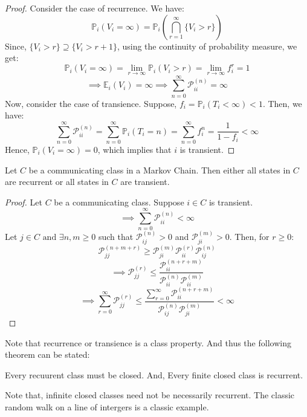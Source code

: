 \begin{proof}
    Consider the case of recurrence. We have:
    \[
        \mathbb{P} _i (V_i = \infty ) = \mathbb{P} _i \left( 
            \bigcap_{r=1}^{\infty} \{V_i > r\}
         \right) 
    \]
    Since, \(\{V_i > r\} \supseteq \{V_i > r+1\}\), using the continuity of probability measure, we get:
    \[
        \mathbb{P}_i (V_i = \infty) = \lim_{r \to \infty} \mathbb{P}_i (V_i > r) = \lim_{r \to \infty} f_i^r = 1
    \]
    \[
        \implies \mathbb{E} _i (V_i) = \infty \implies \sum_{n=0}^{\infty} \mathcal{P}_{ii}^{(n)} = \infty
    \]
    Now, consider the case of transience. Suppose, \(f_i = \mathbb{P}_i(T_i < \infty ) < 1\). Then, we have:
    \[
        \sum_{n=0}^{\infty} \mathcal{P}_{ii}^{(n)} = \sum_{n=0}^{\infty}
         \mathbb{P}_i(T_i = n) = \sum_{n=0}^{\infty} f_i^n = \frac{1}{1-f_i} < \infty
    \]
    Hence, \(\mathbb{P}_i (V_i = \infty) = 0\), which implies that \(i\) is transient. 
\end{proof}

\begin{theorem}
    Let \(C\) be a communicating class in a Markov Chain. Then either all states in \(C\)
    are recurrent or all states in \(C\) are transient.
\end{theorem}
\begin{proof}
    Let \(C\) be a communicating class. Suppose \(i \in C\) is transient.
    \[
        \implies \sum_{n=0}^{\infty} \mathcal{P}_{ii}^{(n)} < \infty
    \]
    Let \(j \in C \text{ and }  \exists n,m \geq 0 \) such that \(\mathcal{P}_{ij}^{(n)} > 0\) and \(\mathcal{P}_{ji}^{(m)} > 0\).
    Then, for \(r \geq  0\):
    \[
        \mathcal{P}_{jj}^{(n+m+r)} \geq \mathcal{P}_{ji}^{(m)} \mathcal{P}_{ii}^{(r)} \mathcal{P}_{ij}^{(n)}
    \]
    \[
        \implies \mathcal{P}_{jj}^{(r)} \leq \frac{\mathcal{P}_{ii}^{(n + r + m)}}
        {\mathcal{P}_{ii}^{(n)} \mathcal{P}_{ii}^{(m)}}
    \]
    \[
        \implies \sum_{r=0}^{\infty} \mathcal{P}_{jj}^{(r)} \leq \frac{\sum_{r=0}^{\infty} \mathcal{P}_{ii}^{(n + r + m)}}
        {\mathcal{P}_{ij}^{(n)} \mathcal{P}_{ji}^{(m)}} < \infty
    \]
\end{proof}
Note that recurrence or transience is a class property. And thus the following theorem can be stated:
\begin{theorem}
    Every recuurent class must be closed. And, Every finite closed class is recurrent.
\end{theorem}
Note that, infinite closed classes need not be necessarily recurrent. The classic random walk on a line of
intergers is a classic example.


